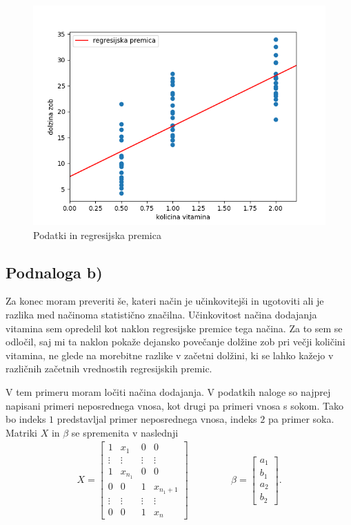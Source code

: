 \documentclass[12pt, a4paper]{article}
\begin{document}
\begin{figure}[H]
\includegraphics[width=\linewidth]{regresijska_premica.png}
\centering
\caption{Podatki in regresijska premica}
\end{figure}

\subsection*{Podnaloga b)}
Za konec moram preveriti še, kateri način je učinkovitejši in ugotoviti ali je razlika med načinoma statistično značilna. Učinkovitost načina dodajanja vitamina sem opredelil kot naklon regresijske premice tega načina. Za to sem se odločil, saj mi ta naklon pokaže dejansko povečanje dolžine zob pri večji količini vitamina, ne glede na morebitne razlike v začetni dolžini, ki se lahko kažejo v različnih začetnih vrednostih regresijskih premic.  

V tem primeru moram ločiti načina dodajanja. V podatkih naloge so najprej napisani primeri neposrednega vnosa, kot drugi pa primeri vnosa s sokom. Tako bo indeks $1$ predstavljal primer neposrednega vnosa, indeks $2$ pa primer soka. Matriki $X$ in $\beta$ se spremenita v naslednji
\begin{align*}
X =
\begin{bmatrix}
1 & x_1 & 0 & 0 \\
\vdots & \vdots & \vdots & \vdots \\
1 & x_{n_1} & 0 & 0 \\
0 & 0 & 1 & x_{n_1 + 1} \\
\vdots & \vdots & \vdots & \vdots \\
0 & 0 & 1 & x_n 
\end{bmatrix}
& \quad & \quad &
\beta = 
\begin{bmatrix}
a_1 \\
b_1 \\
a_2 \\
b_2 
\end{bmatrix}.
\end{align*}
\end{document}
